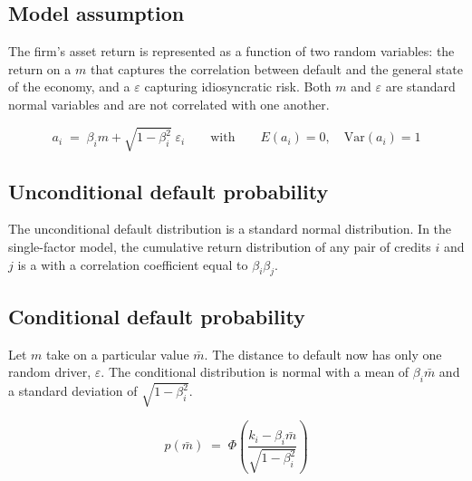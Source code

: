 
\subsection*{Model assumption}

The firm's asset return is represented as a function of two random variables: the
return on a  $m$ that captures the correlation between
default and the general state of the economy, and a  $\varepsilon$
capturing idiosyncratic risk. Both $m$ and $\varepsilon$ are standard normal
variables and are not correlated with one another.

\begin{crfmlbox}
\[ a_i \;=\; \beta_i m + \sqrt{1-\beta_i^{2}}\;\varepsilon_i
   \qquad\text{with}\qquad E(a_i) = 0, \quad \mathrm{Var}(a_i) = 1 \]
\end{crfmlbox}

\subsection*{Unconditional default probability}

The unconditional default distribution is a standard normal distribution. In the
single-factor model, the cumulative return distribution of any pair of credits
$i$ and $j$ is a  with a correlation coefficient
equal to $\beta_i\beta_j$.

\subsection*{Conditional default probability}

Let $m$ take on a particular value $\bar{m}$. The distance to default now has only
one random driver, $\varepsilon$. The conditional distribution is normal with a
mean of $\beta_i\bar{m}$ and a standard deviation of $\sqrt{1-\beta_i^{2}}$.

\begin{crfmlbox}
\[ p(\bar{m}) \;=\; \Phi\!\left(\frac{k_i - \beta_i\bar{m}}
   {\sqrt{1-\beta_i^{2}}}\right) \]
\end{crfmlbox}

